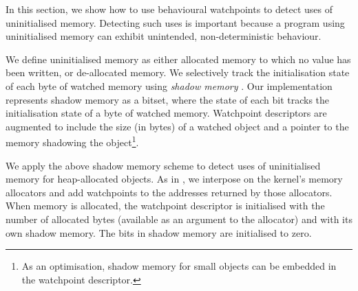 \documentclass[letterpaper,twocolumn,10pt]{article}
\begin{document}
In this section, we show how to use behavioural watchpoints to detect uses of uninitialised memory.  Detecting such uses is important because a program using uninitialised memory can exhibit unintended, non-deterministic behaviour.

We define uninitialised memory as either allocated memory to which no value has been written, or de-allocated memory. We selectively track the initialisation state of each byte of watched memory using \emph{shadow memory} \cite{Memcheck}. Our implementation represents shadow memory as a bitset, where the state of each bit tracks the initialisation state of a byte of watched memory. Watchpoint descriptors are augmented to include the size (in bytes) of a watched object and a pointer to the memory shadowing the object\footnote{As an optimisation, shadow memory for small objects can be embedded in the watchpoint descriptor.}.



We apply the above shadow memory scheme to detect uses of uninitialised memory for heap-allocated objects. As in , we interpose on the kernel's memory allocators and add watchpoints to the addresses returned by those allocators. When memory is allocated, the watchpoint descriptor is initialised with the number of allocated bytes (available as an argument to the allocator) and with its own shadow memory. The bits in shadow memory are initialised to zero.
\end{document}
